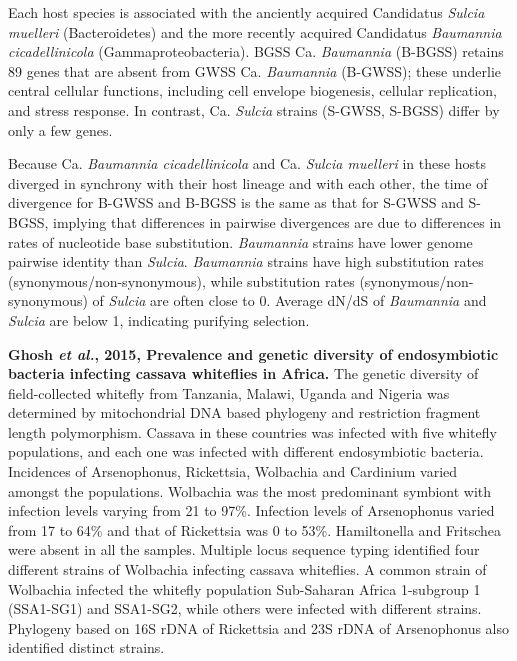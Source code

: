 \documentclass[11pt]{article}
\begin{document}
\begin{sloppypar}
Each host species is associated with the anciently acquired Candidatus \textit{Sulcia muelleri} (Bacteroidetes) and the more recently acquired Candidatus \textit{Baumannia cicadellinicola} (Gammaproteobacteria). 
BGSS Ca. \textit{Baumannia} (B-BGSS) retains 89 genes that are absent from GWSS Ca. \textit{Baumannia} (B-GWSS); these underlie central cellular functions, including cell envelope biogenesis, cellular replication, and stress response. In contrast, Ca. \textit{Sulcia} strains (S-GWSS, S-BGSS) differ by only a few genes.
\par
Because Ca. \textit{Baumannia cicadellinicola} and Ca. \textit{Sulcia muelleri} in these hosts diverged in synchrony with their host lineage and with each other, the time of divergence for B-GWSS and B-BGSS is the same as that for S-GWSS and S-BGSS, implying that differences in pairwise divergences are due to differences in rates of nucleotide base substitution. 
\textit{Baumannia} strains have lower genome pairwise identity than \textit{Sulcia}. 
\textit{Baumannia} strains have high substitution rates (synonymous/non-synonymous), while substitution rates (synonymous/non-synonymous) of \textit{Sulcia} are often close to 0. 
Average dN/dS of \textit{Baumannia} and \textit{Sulcia} are below 1, indicating purifying selection. 
\par
\textbf{Ghosh \textit{et al.}, 2015, Prevalence and genetic diversity of endosymbiotic bacteria infecting cassava whiteflies in Africa.} \newline
The genetic diversity of field-collected whitefly from Tanzania, Malawi, Uganda and Nigeria was determined by mitochondrial DNA based phylogeny and restriction fragment length polymorphism. 
Cassava in these countries was infected with five whitefly populations, and each one was infected with different endosymbiotic bacteria. 
Incidences of Arsenophonus, Rickettsia, Wolbachia and Cardinium varied amongst the populations. 
Wolbachia was the most predominant symbiont with infection levels varying from 21 to 97\%. 
Infection levels of Arsenophonus varied from 17 to 64\% and that of Rickettsia was 0 to 53\%. 
Hamiltonella and Fritschea were absent in all the samples. 
Multiple locus sequence typing identified four different strains of Wolbachia infecting cassava whiteflies. 
A common strain of Wolbachia infected the whitefly population Sub-Saharan Africa 1-subgroup 1 (SSA1-SG1) and SSA1-SG2, while others were infected with different strains. 
Phylogeny based on 16S rDNA of Rickettsia and 23S rDNA of Arsenophonus also identified distinct strains.

\end{sloppypar}
\end{document}
